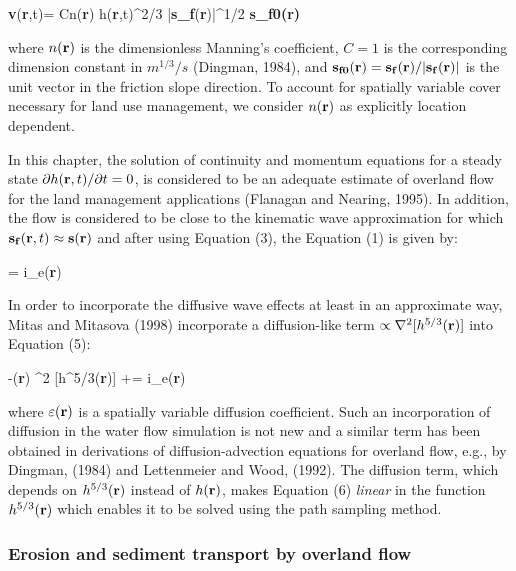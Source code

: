 \documentclass{kapedbk} %
\begin{document}
\leftequation
{\bf v}({\bf r},t)=
{C\over n({\bf r})} h({\bf r},t)^{2/3}
|{\bf s_f}({\bf r})|^{1/2} {\bf s_{f0}({\bf r})}
\endleftequation

\noindent
where $n({\bf r}) $ is the dimensionless Manning's coefficient, $C=1$
is the corresponding dimension constant  in $m^{1/3}/s$ (Dingman, 1984),
and ${\bf s_{f0}}({\bf r})={\bf s_f}({\bf r})/|{\bf s_f}({\bf r})|$
is the unit vector in the friction slope direction.
 To account for spatially variable cover necessary for
land use management, we consider $n({\bf r})$
as  explicitly location dependent.

In this chapter, the solution of continuity and
momentum equations for a steady state $\partial h({\bf r},t)/\partial t =0$,
is considered to be an adequate estimate of overland flow
for the land management applications (Flanagan and Nearing, 1995).
In addition, the flow is considered to be close to the
kinematic wave approximation
 for which ${\bf s_f}({\bf r},t) \approx {\bf s}({\bf r})$ and after
 using Equation (3), the Equation (1) is given by:

\leftequation
\nabla \cdot [ h({\bf r}){\bf v}({\bf r})] = i_e({\bf r})
\endleftequation

\noindent
In order to incorporate the diffusive wave effects at least in an approximate way, 
Mitas and Mitasova (1998) incorporate a diffusion-like term
$ \propto \nabla^2 [h^{5/3}({\bf r})]$ into Equation (5):

\leftequation
-{\varepsilon({\bf r}) }\nabla^2 [h^{5/3}({\bf r})]
+\nabla \cdot [ h({\bf r}){\bf v}({\bf r})] = i_e({\bf r})
\endleftequation

\noindent
 where $\varepsilon({\bf r})$ is a spatially variable diffusion coefficient.
Such an incorporation of diffusion in the water flow simulation is not new
 and a similar term has been obtained in derivations of diffusion-advection 
equations for overland flow, e.g.,  by Dingman, (1984) and Lettenmeier and Wood, (1992).
The diffusion term, which depends on $h^{5/3}({\bf r})$ instead of
 $h({\bf r})$, makes Equation (6)  {\sl linear}
 in the function $h^{5/3}({\bf r})$ which enables it to be 
 solved using the path sampling method.


\medskip
\noindent
\subsubsection{Erosion and sediment transport by overland flow}

\quad
\end{document}
